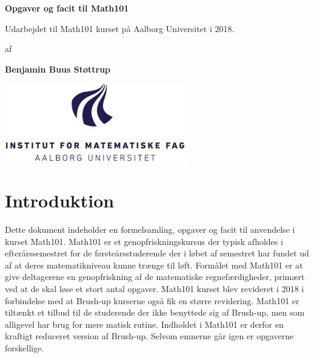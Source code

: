 



\author{Benjamin Buus Støttrup}

\pagestyle{plain}
\begin{titlepage}
    \begin{center}
        \vspace*{1cm}
        \Huge
        \textbf{Opgaver og facit til Math101}

        \vspace{0.5cm}
        \large
        Udarbejdet til Math101 kurset på Aalborg Universitet i 2018.
        \vspace{1.5cm}

        af

        \vspace{1.5cm}
        \textbf{Benjamin Buus Støttrup}

    
        \vspace{5cm}
        \includegraphics{AAU_MATH.jpg}
        \vfill


    \end{center}
    \doclicenseThis
 \end{titlepage}



\tableofcontents
\chapter*{Introduktion}\normalsize
Dette dokument indeholder en formelsamling, opgaver og facit til anvendelse i kurset Math101. Math101 er et genopfriskningskursus der typisk afholdes i efterårssemestret for de førsteårsstuderende der i løbet af semestret har fundet ud af at deres matematikniveau kunne trænge til løft. Formålet med Math101 er at give deltagerene en genopfriskning af de matematiske regnefærdigheder, primært ved at de skal løse et stort antal opgaver. Math101 kurset blev revideret i 2018 i forbindelse med at Brush-up kurserne også fik en større revidering. Math101 er tiltænkt et tilbud til de studerende der ikke benyttede sig af Brush-up, men som alligevel har brug for mere matisk rutine. Indholdet i Math101 er derfor en kraftigt reduceret version af Brush-up. Selvom emnerne går igen er opgaverne forskellige.

